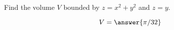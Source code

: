 \documentclass{ximera}
\author{David Guichard \and Neal Koblitz \and H. Jerome Keisler \and Albert Scheller \and Barry Balof \and Mike Wills \and Matthew Carr}
\begin{document}
\begin{exercise}




Find the volume $V$ bounded by $z=x^2+y^2$ and $z=y$.
\begin{prompt}
\[
V=\answer{\pi/32}
\]
\end{prompt}



\end{exercise}
\end{document}
